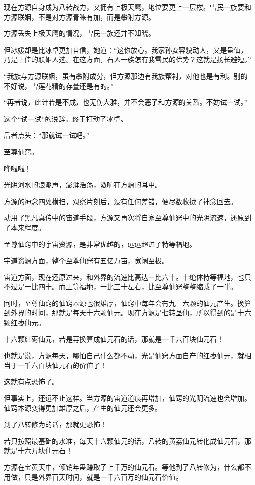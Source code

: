 \begin{this_body}
现在方源自身成为八转战力，又拥有上极天鹰，地位要更上一层楼。雪民一族要和方源联姻，不是对方源青睐有加，而是攀附方源。

方源丢失上极天鹰的情况，雪民一族还并不知晓。

但冰媛却是比冰卓更加自信，她道：“这你放心。我家孙女容貌动人，又是蛊仙，乃是上佳的联姻人选。在这方面，石人一族怎有我雪民的优势？这就是扬长避短。”

“我族与方源联姻，虽有攀附成分，但方源那边有我族帮衬，对他也是有利。别的不好说，雪莲花精的存量还是有的。”

“再者说，此计若是不成，也无伤大雅，并不会恶了和方源的关系。不妨试一试。”

这个“试一试”的说辞，终于打动了冰卓。

后者点头：“那就试一试吧。”

至尊仙窍。

哗啦啦！

光阴河水的浪潮声，澎湃浩荡，激响在方源的耳中。

方源的神念四处横扫，观察片刻后，没有任何差错，便尽数收拢了神念回去。

动用了黑凡真传中的宙道手段，方源又再次将自家至尊仙窍中的光阴流速，还原到了本来程度。

至尊仙窍中的宇宙资源，是非常优越的，远远超过了特等福地。

宇道资源方面，整个至尊仙窍有五亿万亩，宽阔至极。

宙道方面，现在还原过来，和外界的流速比高达一比六十。十绝体特等福地，也只不过是一比四十。而上等福地，一比三十左右，比至尊仙窍整整缩减了一半。

同时，至尊仙窍的仙窍本源也很雄厚，仙窍中每年会有九十六颗的仙元产生。换算到外界的时间，那就是每天十六颗仙元。现在方源是七转蛊仙，所以得到的是十六颗红枣仙元。

十六颗红枣仙元，若是再换算成仙元石的话，那就是一千六百块仙元石！

也就是说，方源每天，哪怕自己什么都不动，光是仙窍方面自产的红枣仙元，就相当于一千六百块仙元石的价值了！

这就有点恐怖了。

但事实上，还远不止这样。当方源的宙道道痕再增加，仙窍的光阴流速也会增加。仙窍本源变得更加雄厚之后，产生的仙元还会更多。

到了八转修为的话，那就更恐怖！

若只按照最基础的水准，每天十六颗仙元的话，八转的黄荔仙元转化成仙元石，那就是十六万块仙元石！

方源在宝黄天中，倾销年蛊赚取了上千万的仙元石。等他到了八转修为，什么都不用做，只是外界百天时间，就是一千六百万的仙元石价值。


\end{this_body}
